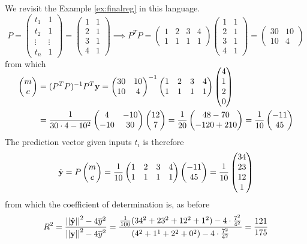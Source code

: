 \goodbreak


\begin{examples}{}{}
\exstart We revisit the Example \ref{ex:finalreg} in this language.
\[P=\begin{pmatrix}
t_1&1\\
t_2&1\\
\vdots&\vdots\\
t_n&1
\end{pmatrix}=\begin{pmatrix}
1&1\\
2&1\\
3&1\\
4&1
\end{pmatrix} \implies P^TP=\begin{pmatrix}
1&2&3&4\\
1&1&1&1
\end{pmatrix}\begin{pmatrix}
1&1\\
2&1\\
3&1\\
4&1
\end{pmatrix} =\begin{pmatrix}
30&10\\
10&4
\end{pmatrix}\]
from which
\begin{align*}
\begin{pmatrix}m\\c\end{pmatrix}&=(P^TP)^{-1}P^T{\mathbf{y}} =\begin{pmatrix}
30&10\\
10&4
\end{pmatrix}^{-1}\begin{pmatrix}
1&2&3&4\\
1&1&1&1
\end{pmatrix}\smash[t]{\begin{pmatrix}4\\1\\2\\0\end{pmatrix}}\\
&=\frac 1{30\cdot 4-10^2}\begin{pmatrix}
4&-10\\
-10&30
\end{pmatrix}\begin{pmatrix}12\\7\end{pmatrix} =\frac 1{20}\begin{pmatrix}48-70\\-120+210\end{pmatrix}=\frac 1{10}\begin{pmatrix}-11\\45\end{pmatrix}
\end{align*}
The prediction vector given inputs $t_i$ is therefore
\[
\hat{{\mathbf{y}}}=P\begin{pmatrix}m\\c\end{pmatrix}=\frac 1{10}\begin{pmatrix}
1&2&3&4\\
1&1&1&1
\end{pmatrix}\begin{pmatrix}-11\\45\end{pmatrix} =\frac 1{10}\begin{pmatrix}34\\23\\12\\1\end{pmatrix}
\]
from which the coefficient of determination is, as before
\[R^2=\frac{\left| \left| \hat{{\mathbf{y}}}\right|\right|^2-4\overline{y}^2}{\left| \left| {\mathbf{y}}\right|\right|^2-4\overline{y}^2} =\frac{\frac 1{100}(34^2+23^2+12^2+1^2)-4\cdot\frac{7^2}{4^2}}{(4^2+1^1+2^2+0^2)-4\cdot\frac{7^2}{4^2}} =\frac{121}{175}\]

\end{examples}
